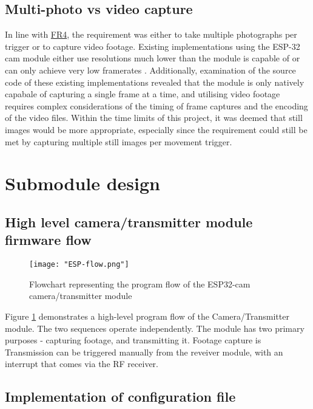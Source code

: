 \documentclass[class=report,11pt,crop=false]{standalone}
\begin{document}
\subsection{Multi-photo vs video capture}

In line with \hyperlink{tab:firmware-requirements}{FR4}, the requirement was either to take multiple photographs per trigger or to capture video footage. Existing implementations using the ESP-32 cam module either use resolutions much lower than the module is capable of or can only achieve very low framerates \cite{zahary2019esp}. Additionally, examination of the source code of these existing implementations revealed that the module is only natively capabale of capturing a single frame at a time, and utilising video footage requires complex considerations of the timing of frame captures and the encoding of the video files. Within the time limits of this project, it was deemed that still images would be more appropriate, especially since the requirement could still be met by capturing multiple still images per movement trigger. 

\section{Submodule design} \label{s:firmware-design-process}

\subsection{High level camera/transmitter module firmware flow} \label{ss:espflow}

\begin{figure}[ht]
    \centering
    \texttt{[image: "ESP-flow.png"]}
    \caption{Flowchart representing the program flow of the ESP32-cam camera/transmitter module}
    \label{fig:espflow}
\end{figure}

Figure \ref{fig:espflow} demonstrates a high-level program flow of the Camera/Transmitter module. The two sequences operate independently. The module has two primary purposes - capturing footage, and transmitting it. Footage capture is Transmission can be triggered manually from the reveiver module, with an interrupt that comes via the RF receiver. 

\subsection{Implementation of configuration file}
\end{document}
